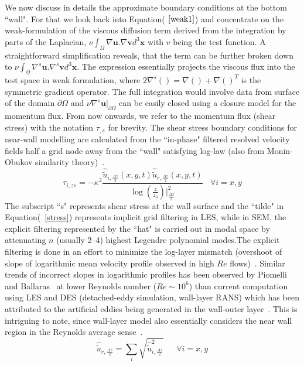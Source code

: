 \documentclass[times]{fldauth}
\begin{document}
We now discuss in details the approximate boundary conditions at the bottom ``wall". For that we look back into Equation($~\ref{weak1}$) and concentrate on the weak-formulation of the viscous diffusion term derived from the integration by parts of the Laplacian, $\nu\int_{\Omega}\nabla \mathbf{u}.\nabla \mathbf{v}d^{3}\mathbf{x}$ with $v$ being the test function. A straightforward simplification reveals, that the term can be further broken down to  $\nu\int_{\Omega}\nabla^{s} \mathbf{u}.\nabla^{s} \mathbf{v}d^{3}\mathbf{x}$. The expression essentially projects the viscous flux into the test space in weak formulation, where $2\nabla^{s}() = \nabla() + \nabla()^{T}$ is the symmetric gradient operator. The full integration would involve data from surface of the domain $\partial \Omega$ and $\nu\nabla^{s} \mathbf{u}|_{\partial \Omega}$ can be easily closed using a closure model for the momentum flux. From now onwards, we refer to the momentum flux (shear stress) with the notation $\tau_{,s}$ for brevity. The shear stress boundary conditions for near-wall modelling are calculated from the ``in-phase" filtered resolved velocity fields half a grid node away from the ``wall" satisfying log-law (also from Monin-Obukov similarity theory)~\cite{obu}.
\begin{equation}
\tau_{i,zs} = -\kappa^{2}\frac{\widehat{\widetilde{u}}_{i,\frac{\Delta z}{2}}(x,y,t)\widehat{\widetilde{u}}_{r,\frac{\Delta z}{2}}(x,y,t)}{\log (\frac{z}{z_0})|_{\frac{\Delta z}{2}}^{2}} \ \ \ \  \forall i = x,y \label{stress}
\end{equation}
The subscript ``s" represents shear stress at the wall surface and the ``tilde" in Equation(~\ref{stress}) represents implicit grid filtering in LES, while in SEM, the explicit filtering represented by the ``hat" is carried out in modal space by attenuating $n$ (usually 2--4) highest Legendre polynomial modes.The explicit filtering is done in an effort to minimize the log-layer mismatch
(overshoot of slope of logarithmic mean velocity profile observed in high $Re$ flows)~\cite{bou1,meyers2}. Similar trends of incorrect slopes in logarithmic profiles has been observed by Piomelli and Ballaras~\cite{pio2} at lower Reynolds number ($Re\sim 10^6$) than current computation using LES and DES (detached-eddy simulation, wall-layer RANS) which has been attributed to the artificial eddies being generated in the wall-outer layer~\cite{bag2}. This is intriguing to note, since wall-layer model also essentially considers the near wall region in the Reynolds average sense~\cite{pio2,jimtech,lars}.
\begin{equation}
\widehat{\widetilde{u}}_{r,\frac{\Delta z}{2}} = \sum_{i}\sqrt{\widehat{\widetilde{u}}_{i,\frac{\Delta z}{2}}^{2}} \ \ \ \ \ \ \ \forall i = x,y
\end{equation}
\end{document}
